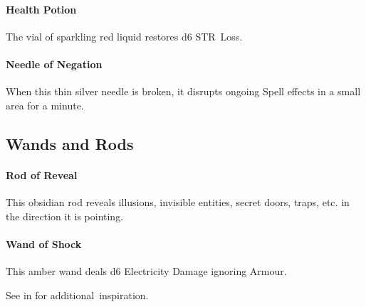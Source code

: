\documentclass[itdr]{subfiles}
\begin{document}
\paragraph{Health Potion}
The vial of sparkling red liquid restores d6 STR~Loss.

\paragraph{Needle of Negation}
When this thin silver needle is broken, it disrupts ongoing Spell effects in a small area for a minute.

\vfill

\subsection*{Wands and Rods}

\paragraph{Rod of Reveal}
This obsidian rod reveals illusions, invisible entities, secret doors, traps, etc. in the direction it is pointing.

\paragraph{Wand of Shock}
This amber wand deals d6 Electricity Damage \mbox{ignoring} Armour.

\vfill

\begin{dbox}
	See \textbf{} in \textbf{} for \mbox{additional inspiration}.
\end{dbox}

\vfill
\end{document}
